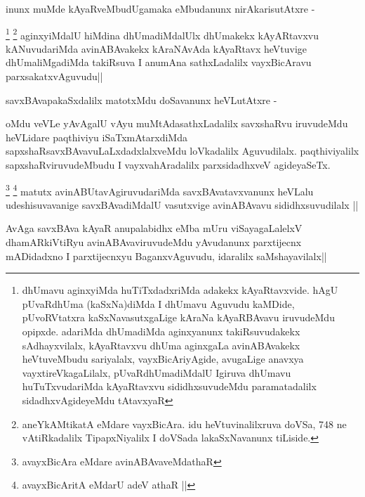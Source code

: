 \begin{artha}
inunx muMde kAyaRveMbudUgamaka eMbudanunx nirAkarisutAtxre -
\end{artha}

\begin{artha}
\footnote[1]{dhUmavu aginxyiMda huTiTxdadxriMda adakekx kAyaRtavxvide. hAgU pUvaRdhUma (kaSxNa)diMda I dhUmavu Aguvudu kaMDide, pUvoRVtatxra kaSxNavasutxgaLige kAraNa kAyaRBAvavu iruvudeMdu opipxde. adariMda dhUmadiMda aginxyanunx takiRsuvudakekx sAdhayxvilalx, kAyaRtavxvu dhUma aginxgaLa avinABAvakekx heVtuveMbudu sariyalalx, vayxBicAriyAgide, avugaLige anavxya vayxtireVkagaLilalx, pUvaRdhUmadiMdalU Igiruva dhUmavu huTuTxvudariMda kAyaRtavxvu sididhxsuvudeMdu paramatadalilx sidadhxvAgideyeMdu tAtavxyaR}
\footnote[2]{aneYkAMtikatA eMdare vayxBicAra. idu heVtuvinalilxruva doVSa, 748 ne vAtiRkadalilx TipapxNiyalilx I doVSada lakaSxNavanunx tiLiside.}
aginxyiMdalU hiMdina dhUmadiMdalUlx dhUmakekx kAyARtavxvu kANuvudariMda avinABAvakekx kAraNAvAda kAyaRtavx heVtuvige dhUmaliMgadiMda takiRsuva I anumAna sathxLadalilx vayxBicAravu parxsakatxvAguvudu||
\end{artha}

\begin{artha}
savxBAvapakaSxdalilx matotxMdu doSavanunx heVLutAtxre -
\end{artha}

\begin{artha}
oMdu veVLe yAvAgalU vAyu muMtAdasathxLadalilx savxshaRvu iruvudeMdu heVLidare paqthiviyu iSaTxmAtarxdiMda sapxshaRsavxBAvavuLaLxdadxlalxveMdu loVkadalilx Aguvudilalx. paqthiviyalilx sapxshaRviruvudeMbudu I vayxvahAradalilx parxsidadhxveV agideyaSeTx. 
\end{artha}

\begin{artha}
\footnote[1]{avayxBicAra eMdare avinABAvaveMdathaR}
\footnote[2]{avayxBicAritA eMdarU adeV athaR ||}
matutx avinABUtavAgiruvudariMda savxBAvatavxvanunx heVLalu udeshisuvavanige savxBAvadiMdalU vasutxvige avinABAvavu sididhxsuvudilalx ||  
\end{artha}


\begin{artha}
AvAga savxBAva kAyaR anupalabidhx eMba mUru viSayagaLalelxV dhamARkiVtiRyu avinABAvaviruvudeMdu yAvudanunx parxtijecnx mADidadxno I parxtijecnxyu BaganxvAguvudu, idaralilx saMshayavilalx||
\end{artha}

